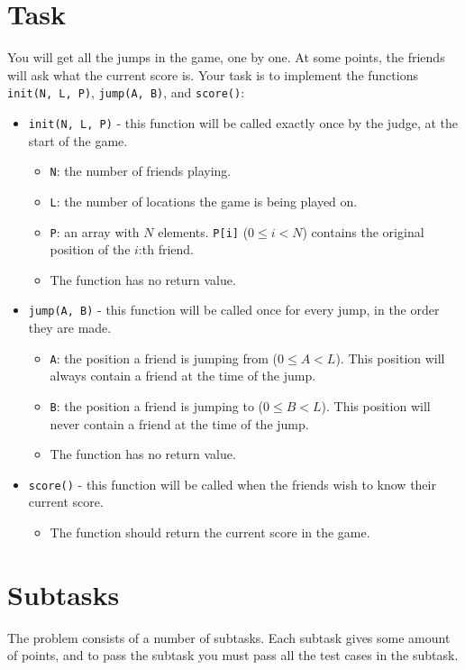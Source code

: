 \section*{Task}
You will get all the jumps in the game, one by one. At some points, the friends will ask what the current score is. Your task is to
implement the functions \texttt{init(N, L, P)}, \texttt{jump(A, B)}, and \texttt{score()}:
\begin{itemize}
  \item \texttt{init(N, L, P)} - this function will be called exactly once by the judge, at the start of the game.
  \begin{itemize}
    \item \texttt{N}: the number of friends playing.
    \item \texttt{L}: the number of locations the game is being played on.
    \item \texttt{P}: an array with $N$ elements. \texttt{P[i]} ($0 \le i < N$) contains the original position of the $i$:th friend.
    \item The function has no return value.
  \end{itemize}

  \item \texttt{jump(A, B)} - this function will be called once for every jump, in the order they are made.
  \begin{itemize}
    \item \texttt{A}: the position a friend is jumping from ($0 \le A < L$). This position will always contain a friend at the time of the jump.
    \item \texttt{B}: the position a friend is jumping to ($0 \le B < L$). This position will never contain a friend at the time of the jump.
    \item The function has no return value.
  \end{itemize}

  \item \texttt{score()} - this function will be called when the friends wish to know their current score.
  \begin{itemize}
    \item The function should return the current score in the game.
  \end{itemize}

\end{itemize}

\section*{Subtasks}
The problem consists of a number of subtasks. Each subtask gives some amount of points, and to pass
the subtask you must pass all the test cases in the subtask.

